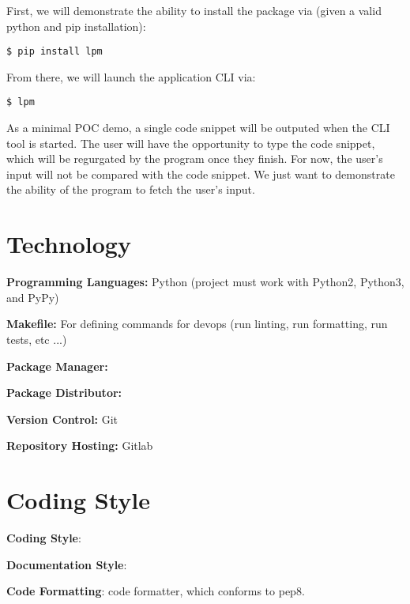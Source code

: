 \documentclass{article}
\begin{document}
\noindent First, we will demonstrate the ability to install the package via (given a valid python and pip installation):

\begin{lstlisting}
$ pip install lpm
\end{lstlisting}

\noindent From there, we will launch the application CLI via:

\begin{lstlisting}
$ lpm
\end{lstlisting}

\noindent As a minimal POC demo, a single code snippet will be outputed when the CLI tool is started. The user will have the opportunity to type the code snippet, which will be regurgated by the program once they finish. For now, the user's input will not be compared with the code snippet. We just want to demonstrate the ability of the program to fetch the user's input.

\section{Technology}

\noindent \textbf{Programming Languages:} Python (project must work with Python2, Python3, and PyPy)

\noindent \textbf{Makefile:} For defining commands for devops (run linting, run formatting, run tests, etc ...)

\noindent \textbf{Package Manager:} \href{https://pypi.org/project/pip/}{\color{blue}{pip}}

\noindent \textbf{Package Distributor:} \href{https://pypi.org/}{\color{blue}{PyPI}}

\noindent \textbf{Version Control:} Git

\noindent \textbf{Repository Hosting:} Gitlab

\section{Coding Style}

\noindent \textbf{Coding Style}: \href{https://www.python.org/dev/peps/pep-0008/}{\color{blue}{pep8}}

\noindent \textbf{Documentation Style}: \href{https://numpydoc.readthedocs.io/en/latest/}{\color{blue}{numpydoc}}

\noindent \textbf{Code Formatting}: \href{https://black.readthedocs.io/en/stable/}{\color{blue}{black}} code formatter, which conforms to pep8.
\end{document}
